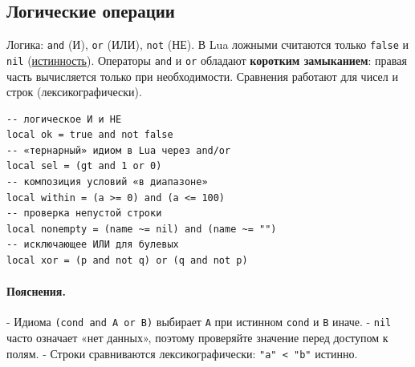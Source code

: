 \subsection{Логические операции}
Логика: \verb|and| (И), \verb|or| (ИЛИ), \verb|not| (НЕ). В Lua ложными считаются только \verb|false| и \verb|nil| (\hyperlink{term:truthiness}{истинность}). Операторы \verb|and| и \verb|or| обладают \textbf{коротким замыканием}: правая часть вычисляется только при необходимости. Сравнения работают для чисел и строк (лексикографически).
\begin{verbatim}
-- логическое И и НЕ
local ok = true and not false
-- «тернарный» идиом в Lua через and/or
local sel = (gt and 1 or 0)
-- композиция условий «в диапазоне»
local within = (a >= 0) and (a <= 100)
-- проверка непустой строки
local nonempty = (name ~= nil) and (name ~= "")
-- исключающее ИЛИ для булевых
local xor = (p and not q) or (q and not p)
\end{verbatim}
\paragraph{Пояснения.}
- Идиома \verb|(cond and A or B)| выбирает \verb|A| при истинном \verb|cond| и \verb|B| иначе.
- \verb|nil| часто означает «нет данных», поэтому проверяйте значение перед доступом к полям.
- Строки сравниваются лексикографически: \verb|"a" < "b"| истинно.
